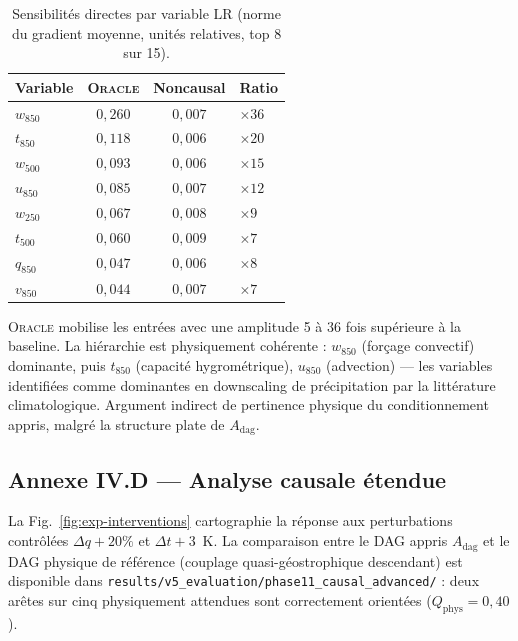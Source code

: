 \documentclass[14pt,a4paper,openany]{extreport}
\newcommand{\Oracle}{\textsc{Oracle}}
\newcommand{\LR}{\ensuremath{\text{LR}}}
\newcommand{\Adag}{\ensuremath{A_{\mathrm{dag}}}}
\begin{document}
\begin{table}[ht]
  \centering
  \small
  \caption[Sensibilités directes par variable]{Sensibilités directes par variable \LR{} (norme du gradient moyenne, unités relatives, top 8 sur 15).}
  \label{tab:exp-res-sens}
  \begin{tabularx}{\linewidth}{l c c X}
    \toprule
    \textbf{Variable} & \Oracle{} & \textbf{Noncausal} & \textbf{Ratio} \\
    \midrule
    $w_{850}$ & $0{,}260$ & $0{,}007$ & $\times 36$ \\
    $t_{850}$ & $0{,}118$ & $0{,}006$ & $\times 20$ \\
    $w_{500}$ & $0{,}093$ & $0{,}006$ & $\times 15$ \\
    $u_{850}$ & $0{,}085$ & $0{,}007$ & $\times 12$ \\
    $w_{250}$ & $0{,}067$ & $0{,}008$ & $\times 9$ \\
    $t_{500}$ & $0{,}060$ & $0{,}009$ & $\times 7$ \\
    $q_{850}$ & $0{,}047$ & $0{,}006$ & $\times 8$ \\
    $v_{850}$ & $0{,}044$ & $0{,}007$ & $\times 7$ \\
    \bottomrule
  \end{tabularx}
\end{table}

\Oracle{} mobilise les entrées avec une amplitude 5 à 36 fois supérieure à la baseline. La hiérarchie est physiquement cohérente : $w_{850}$ (forçage convectif) dominante, puis $t_{850}$ (capacité hygrométrique), $u_{850}$ (advection) --- les variables identifiées comme dominantes en downscaling de précipitation par la littérature climatologique. Argument indirect de pertinence physique du conditionnement appris, malgré la structure plate de $\Adag$.

\subsection*{Annexe IV.D --- Analyse causale étendue}
\label{ssec:exp-annexe-causal-ext}

La Fig.~\ref{fig:exp-interventions} cartographie la réponse aux perturbations contrôlées $\Delta q+20\%$ et $\Delta t+3$~K. La comparaison entre le DAG appris $\Adag$ et le DAG physique de référence (couplage quasi-géostrophique descendant) est disponible dans \texttt{results/v5\_evaluation/phase11\_causal\_advanced/} : deux arêtes sur cinq physiquement attendues sont correctement orientées ($Q_{\mathrm{phys}}=0{,}40$).
\end{document}
